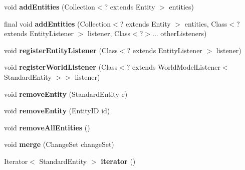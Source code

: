 \begin{DoxyCompactItemize}
void {\bfseries add\+Entities} (Collection$<$? extends Entity $>$ entities)
\item 
\hypertarget{classadf_1_1agent_1_1info_1_1WorldInfo_a674e8a2b31f78704ccdd32ef2a2d10ec}{}\label{classadf_1_1agent_1_1info_1_1WorldInfo_a674e8a2b31f78704ccdd32ef2a2d10ec} 
final void {\bfseries add\+Entities} (Collection$<$? extends Entity $>$ entities, Class$<$? extends Entity\+Listener $>$ listener, Class$<$?$>$... other\+Listeners)
\item 
\hypertarget{classadf_1_1agent_1_1info_1_1WorldInfo_a2a7db130ab2c068c1d2ec10c741570cc}{}\label{classadf_1_1agent_1_1info_1_1WorldInfo_a2a7db130ab2c068c1d2ec10c741570cc} 
void {\bfseries register\+Entity\+Listener} (Class$<$? extends Entity\+Listener $>$ listener)
\item 
\hypertarget{classadf_1_1agent_1_1info_1_1WorldInfo_a3047a43247f758c814ad0a4f6d30fcb9}{}\label{classadf_1_1agent_1_1info_1_1WorldInfo_a3047a43247f758c814ad0a4f6d30fcb9} 
void {\bfseries register\+World\+Listener} (Class$<$? extends World\+Model\+Listener$<$ Standard\+Entity $>$$>$ listener)
\item 
\hypertarget{classadf_1_1agent_1_1info_1_1WorldInfo_a66dad109ba15b033e25a6e194c6f5326}{}\label{classadf_1_1agent_1_1info_1_1WorldInfo_a66dad109ba15b033e25a6e194c6f5326} 
void {\bfseries remove\+Entity} (Standard\+Entity e)
\item 
\hypertarget{classadf_1_1agent_1_1info_1_1WorldInfo_a9610aca85dde27df0a7816b8b88502e3}{}\label{classadf_1_1agent_1_1info_1_1WorldInfo_a9610aca85dde27df0a7816b8b88502e3} 
void {\bfseries remove\+Entity} (Entity\+ID id)
\item 
\hypertarget{classadf_1_1agent_1_1info_1_1WorldInfo_a06e762cd1c4741e24e36a72659227f7f}{}\label{classadf_1_1agent_1_1info_1_1WorldInfo_a06e762cd1c4741e24e36a72659227f7f} 
void {\bfseries remove\+All\+Entities} ()
\item 
\hypertarget{classadf_1_1agent_1_1info_1_1WorldInfo_ad97e4fe096c17967c3d705724710c36a}{}\label{classadf_1_1agent_1_1info_1_1WorldInfo_ad97e4fe096c17967c3d705724710c36a} 
void {\bfseries merge} (Change\+Set change\+Set)
\item 
\hypertarget{classadf_1_1agent_1_1info_1_1WorldInfo_a22c195eb8e7ccb5f13ae834fa8f0f821}{}\label{classadf_1_1agent_1_1info_1_1WorldInfo_a22c195eb8e7ccb5f13ae834fa8f0f821} 
Iterator$<$ Standard\+Entity $>$ {\bfseries iterator} ()
\item 
\hypertarget{classadf_1_1agent_1_1info_1_1WorldInfo_a4814258455e7263d9beee4e217bd8c34}{}\label{classadf_1_1agent_1_1info_1_1WorldInfo_a4814258455e7263d9beee4e217bd8c34} 
$$
\end{DoxyCompactItemize}
